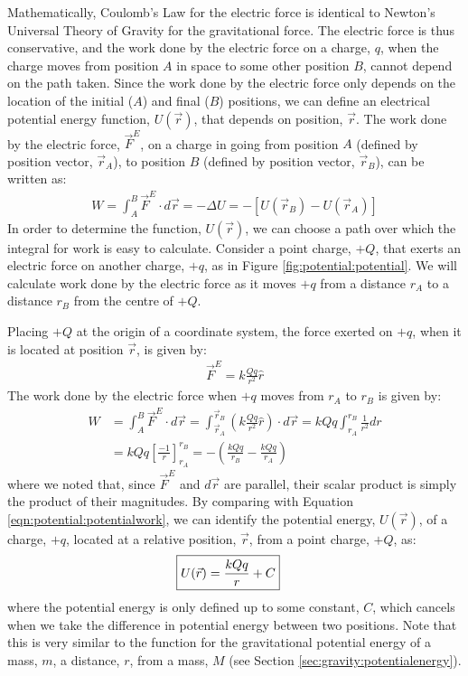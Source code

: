 Mathematically, Coulomb's Law for the electric force is identical to Newton's Universal Theory of Gravity for the gravitational force. The electric force is thus conservative, and the work done by the electric force on a charge, $q$, when the charge moves from position $A$ in space to some other position $B$, cannot depend on the path taken. Since the work done by the electric force only depends on the location of the initial ($A$) and final ($B$) positions, we can define an electrical potential energy function, $U(\vec r)$, that depends on position, $\vec r$. The work done by the electric force, $\vec F^E$,  on a charge in going from position $A$ (defined by position vector, $\vec r_A$), to position $B$ (defined by position vector, $\vec r_B$), can be written as:
\begin{align}
\label{eqn:potential:potentialwork}
W=\int_A^B \vec F^E\cdot d\vec r=-\Delta U=-\left[ U(\vec r_B)-U(\vec r_A) \right]
\end{align}
In order to determine the function, $U(\vec r)$, we can choose a path over which the integral for work is easy to calculate. Consider a point charge, $+Q$, that exerts an electric force on another charge, $+q$, as in Figure \ref{fig:potential:potential}. We will calculate work done by the electric force as it moves $+q$ from a distance $r_A$ to a distance $r_B$ from the centre of $+Q$.

Placing $+Q$ at the origin of a coordinate system, the force exerted on $+q$, when it is located at position $\vec r$, is given by:
\begin{align*}
\vec F^E=k\frac{Qq}{r^2}\hat r
\end{align*}
The work done by the electric force when $+q$ moves from $r_A$ to $r_B$ is given by:
\begin{align*}
W&=\int_A^B \vec F^E\cdot d\vec r=\int_{\vec r_A}^{\vec r_B} \left(k\frac{Qq}{r^2}\hat r\right)\cdot d\vec r=kQq \int_{r_A}^{r_B} \frac{1}{r^2}dr\\
&=kQq \left[\frac{-1}{r} \right]_{r_A}^{r_B}=-\left(\frac{kQq}{r_B}-\frac{kQq}{r_A}\right)
\end{align*}
where we noted that, since $\vec F^E$ and $d\vec r$ are parallel, their scalar product is simply the product of their magnitudes. By comparing with Equation \ref{eqn:potential:potentialwork}, we can identify the potential energy, $U(\vec r)$, of a charge, $+q$, located at a relative position, $\vec r$, from a point charge, $+Q$, as:
\begin{align*}
\Aboxed{U(\vec r)=\frac{kQq}{r}+C}
\end{align*}
where the potential energy is only defined up to some constant, $C$, which cancels when we take the difference in potential energy between two positions. Note that this is very similar to the function for the gravitational potential energy of a mass, $m$, a distance, $r$, from a mass, $M$ (see Section \ref{sec:gravity:potentialenergy}).

